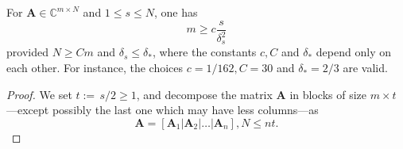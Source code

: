 \begin{theorem}
    \label{th2.8}
    For $\mathbf{A} \in \mathbb{C}^{m \times N}$ and $1 \leq s \leq N$, one has 
    \begin{equation}
        m \geq c \dfrac{s}{\delta_s^2}
        \label{eq2.9}
    \end{equation}
    provided $N \geq Cm$ and $\delta_s \leq \delta_*$, where the constants $c,C$ and $\delta_*$ depend only on each other. For instance, the choices $c = 1/162, C=30$ and $\delta_* = 2/3$ are valid.
\end{theorem}

\begin{proof}
    We set $t := \,s/2\! \geq 1$, and decompose the matrix $\mathbf{A}$ in blocks of size $m \times t$---except possibly the last one which may have less columns---as
    \[
        \mathbf{A} = \left[ \mathbf{A}_1 | \mathbf{A}_2 | \dots| \mathbf{A}_n \right], N \leq nt.
    \]


\end{proof}
